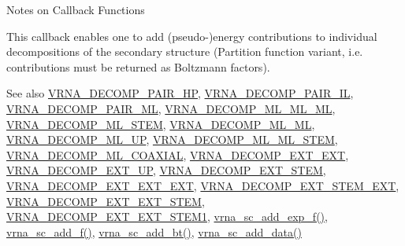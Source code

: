 \begin{DoxyRefDesc}{Notes on Callback Functions}
\item[\mbox{\hyperlink{callbacks__callbacks000015}{Notes on Callback Functions}}]This callback enables one to add (pseudo-\/)energy contributions to individual decompositions of the secondary structure (Partition function variant, i.\+e. contributions must be returned as Boltzmann factors). \end{DoxyRefDesc}


\begin{DoxySeeAlso}{See also}
\mbox{\hyperlink{group__constraints_ga8bd41ebc8039378d242e4e8c273716a5}{V\+R\+N\+A\+\_\+\+D\+E\+C\+O\+M\+P\+\_\+\+P\+A\+I\+R\+\_\+\+HP}}, \mbox{\hyperlink{group__constraints_gaeab04f34d7730cff2d651d782f95d857}{V\+R\+N\+A\+\_\+\+D\+E\+C\+O\+M\+P\+\_\+\+P\+A\+I\+R\+\_\+\+IL}}, \mbox{\hyperlink{group__constraints_gaa15b1185673f0b9e900c4748d45f388f}{V\+R\+N\+A\+\_\+\+D\+E\+C\+O\+M\+P\+\_\+\+P\+A\+I\+R\+\_\+\+ML}}, \mbox{\hyperlink{group__constraints_ga735517266f2e35e1374b8f1ea77ef23e}{V\+R\+N\+A\+\_\+\+D\+E\+C\+O\+M\+P\+\_\+\+M\+L\+\_\+\+M\+L\+\_\+\+ML}}, \mbox{\hyperlink{group__constraints_ga4a23054c75d8efc785de50e3ea87602f}{V\+R\+N\+A\+\_\+\+D\+E\+C\+O\+M\+P\+\_\+\+M\+L\+\_\+\+S\+T\+EM}}, \mbox{\hyperlink{group__constraints_ga7f4cb9ff7a33e67f0539bd39e7b19a78}{V\+R\+N\+A\+\_\+\+D\+E\+C\+O\+M\+P\+\_\+\+M\+L\+\_\+\+ML}}, \mbox{\hyperlink{group__constraints_gae6478dda14e50e2f2cb9ef333a29256e}{V\+R\+N\+A\+\_\+\+D\+E\+C\+O\+M\+P\+\_\+\+M\+L\+\_\+\+UP}}, \mbox{\hyperlink{group__constraints_ga63d8ceb8c96ae3b463e529e28cc0fe98}{V\+R\+N\+A\+\_\+\+D\+E\+C\+O\+M\+P\+\_\+\+M\+L\+\_\+\+M\+L\+\_\+\+S\+T\+EM}}, \mbox{\hyperlink{group__constraints_ga4fe48d575830b16c208e280e01ab1497}{V\+R\+N\+A\+\_\+\+D\+E\+C\+O\+M\+P\+\_\+\+M\+L\+\_\+\+C\+O\+A\+X\+I\+AL}}, \mbox{\hyperlink{group__constraints_ga437adf5115c1999304eff26b41e4c9b6}{V\+R\+N\+A\+\_\+\+D\+E\+C\+O\+M\+P\+\_\+\+E\+X\+T\+\_\+\+E\+XT}}, \mbox{\hyperlink{group__constraints_gaff1ddaffe86d984623910b40cc8a8717}{V\+R\+N\+A\+\_\+\+D\+E\+C\+O\+M\+P\+\_\+\+E\+X\+T\+\_\+\+UP}}, \mbox{\hyperlink{group__constraints_gae44b5ace0d9b4a29088069ecb4cec441}{V\+R\+N\+A\+\_\+\+D\+E\+C\+O\+M\+P\+\_\+\+E\+X\+T\+\_\+\+S\+T\+EM}}, \mbox{\hyperlink{group__constraints_ga803bd818b3f4b2b0a4a5cfa2f7dc2045}{V\+R\+N\+A\+\_\+\+D\+E\+C\+O\+M\+P\+\_\+\+E\+X\+T\+\_\+\+E\+X\+T\+\_\+\+E\+XT}}, \mbox{\hyperlink{group__constraints_gabb09c5b78b75a44502fc77b950125c1e}{V\+R\+N\+A\+\_\+\+D\+E\+C\+O\+M\+P\+\_\+\+E\+X\+T\+\_\+\+S\+T\+E\+M\+\_\+\+E\+XT}}, \mbox{\hyperlink{group__constraints_ga06efd054c9271438f6d82d4559d9e69f}{V\+R\+N\+A\+\_\+\+D\+E\+C\+O\+M\+P\+\_\+\+E\+X\+T\+\_\+\+E\+X\+T\+\_\+\+S\+T\+EM}}, \mbox{\hyperlink{group__constraints_ga2e75d7a77118735b32f25422d9686719}{V\+R\+N\+A\+\_\+\+D\+E\+C\+O\+M\+P\+\_\+\+E\+X\+T\+\_\+\+E\+X\+T\+\_\+\+S\+T\+E\+M1}}, \mbox{\hyperlink{group__soft__constraints_ga87e382b5d0c9b7d9ce1b79c0473ff700}{vrna\+\_\+sc\+\_\+add\+\_\+exp\+\_\+f()}}, \mbox{\hyperlink{group__soft__constraints_ga8c7d907ec0125cd61c04e0908010a4e9}{vrna\+\_\+sc\+\_\+add\+\_\+f()}}, \mbox{\hyperlink{group__soft__constraints_gabde7d07a79bb9a8f4721aee247b674ea}{vrna\+\_\+sc\+\_\+add\+\_\+bt()}}, \mbox{\hyperlink{group__soft__constraints_ga15c6d52471ec97897e2bb7f964f5deb6}{vrna\+\_\+sc\+\_\+add\+\_\+data()}}

\end{DoxySeeAlso}
